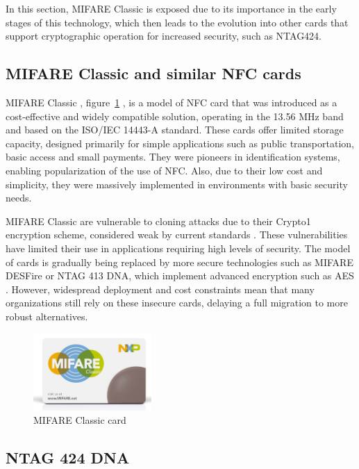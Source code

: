 In this section, MIFARE Classic is exposed due to its importance in the early stages of this technology, which then leads to the evolution into other cards that support cryptographic operation for increased security, such as NTAG424.

\subsection{MIFARE Classic and similar NFC cards}

MIFARE Classic \cite{ref28}, figure~\ref{fig:mifare_classic} \cite{ref81}, is a model of NFC card that was introduced as a cost-effective and widely compatible solution, operating in the 13.56 MHz band and based on the ISO/IEC 14443-A standard. These cards offer limited storage capacity, designed primarily for simple applications such as public transportation, basic access and small payments. They were pioneers in identification systems, enabling popularization of the use of NFC. Also, due to their low cost and simplicity, they were massively implemented in environments with basic security needs.

MIFARE Classic are vulnerable to cloning attacks due to their Crypto1 encryption scheme, considered weak by current standards \cite{ref70}. These vulnerabilities have limited their use in applications requiring high levels of security. The model of cards is gradually being replaced by more secure technologies such as MIFARE DESFire or NTAG 413 DNA, which implement advanced encryption such as AES \cite{ref71}. However, widespread deployment and cost constraints mean that many organizations still rely on these insecure cards, delaying a full migration to more robust alternatives.

\begin{figure}[h!]
	\centering
	\includegraphics[width=0.4\textwidth]{imaxes/mifare1.png} %
	\caption{MIFARE Classic card}
	\label{fig:mifare_classic}
\end{figure}

\subsection{NTAG 424 DNA}

